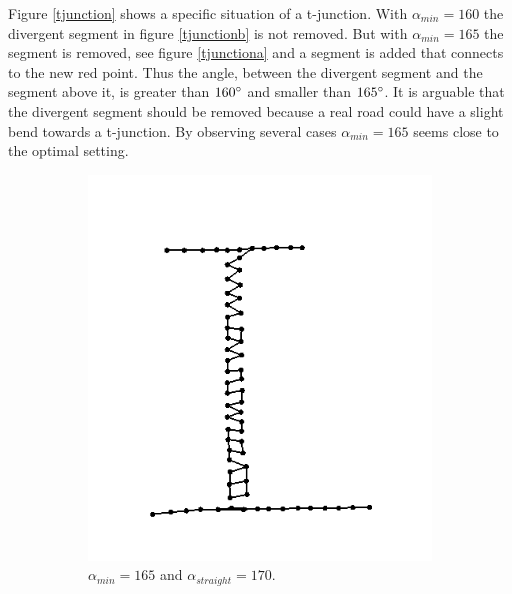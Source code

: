 \documentclass[11pt]{article}
\begin{document}
Figure \ref{tjunction} shows a specific situation of a t-junction. With $\alpha_{min}=160$ the divergent segment in figure \ref{tjunctionb} is not removed. But with $\alpha_{min}=165$ the segment is removed, see figure \ref{tjunctiona} and a segment is added that connects to the new red point. Thus the angle, between the divergent segment and the segment above it, is greater than $160\degree$ and smaller than $165\degree$. It is arguable that the divergent segment should be removed because a real road could have a slight bend towards a t-junction. By observing several cases $\alpha_{min}=165$ seems close to the optimal setting.

\begin{figure}[h]
\centering
  \begin{subfigure}{0.4\linewidth}
  \centering
  \graphicspath{ {images/}}
  \includegraphics[width=\linewidth]{parallel165_165}
  \caption{$\alpha_{min}=165$ and $\alpha_{straight}=170$.}
  \label{parallel}
  \end{subfigure}
    \begin{subfigure}{0.4\linewidth}
  \centering
  \graphicspath{ {images/}}

\end{subfigure}
\end{figure}
\end{document}
